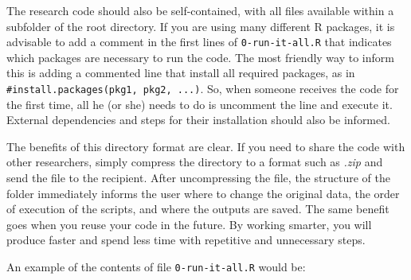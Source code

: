 \documentclass[11pt,]{book}
\begin{document}
The research code should also be self-contained, with all files
available within a subfolder of the root directory. If you are using
many different R packages, it is advisable to add a comment in the first
lines of \texttt{0-run-it-all.R} that indicates which packages are
necessary to run the code. The most friendly way to inform this is
adding a commented line that install all required packages, as in
\texttt{\#install.packages(\textquotesingle{}pkg1\textquotesingle{},\ \textquotesingle{}pkg2\textquotesingle{},\ ...)}.
So, when someone receives the code for the first time, all he (or she)
needs to do is uncomment the line and execute it. External dependencies
and steps for their installation should also be informed.

The benefits of this directory format are clear. If you need to share
the code with other researchers, simply compress the directory to a
format such as \emph{.zip} and send the file to the recipient. After
uncompressing the file, the structure of the folder immediately informs
the user where to change the original data, the order of execution of
the scripts, and where the outputs are saved. The same benefit goes when
you reuse your code in the future. By working smarter, you will produce
faster and spend less time with repetitive and unnecessary steps.

An example of the contents of file \texttt{0-run-it-all.R} would be:
\end{document}
